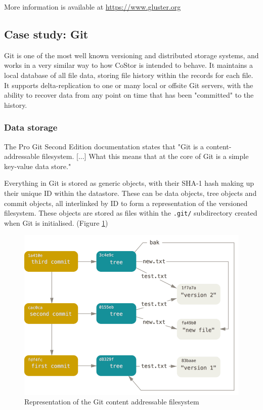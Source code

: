\documentclass[bsc,frontabs,twoside,singlespacing,parskip,deptreport]{infthesis}     %
\begin{document}
More information is available at \url{https://www.gluster.org} \cite{gluster}

\subsection{Case study: Git}

Git is one of the most well known versioning and distributed storage systems, and works in a very
similar way to how CoStor is intended to behave. It maintains a local database of all file data, 
storing file history within the records for each file. It supports delta-replication to one or
many local or offsite Git servers, with the ability to recover data from any point on time that
has been "committed" to the history.

\subsubsection{Data storage}

The Pro Git Second Edition documentation \cite{progit} states that "Git is a content-addressable filesystem. [...]
What this means that at the core of Git is a simple key-value data store."

Everything in Git is stored as generic objects, with their SHA-1 hash making up their unique ID
within the datastore. These can be data objects, tree objects and commit objects, all interlinked by
ID to form a representation of the versioned filesystem. These objects are stored as files within
the \texttt{.git/} subdirectory created when Git is initialised. (Figure \ref{fig:gitfs})

\begin{figure}
	\includegraphics[width=0.6\paperwidth]{img/git-tree}
	\caption{Representation of the Git content addressable filesystem \cite{progit}}
	\label{fig:gitfs}
\end{figure}
\end{document}
